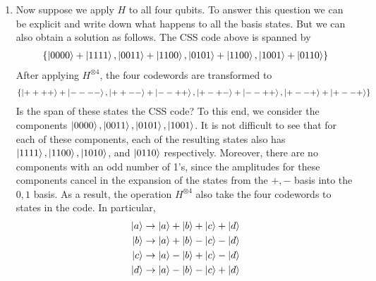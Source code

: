 \documentclass{article}
\theoremstyle{definition}
\begin{document}
\begin{enumerate}[label=(\alph*)]
	\item Now suppose we apply $H$ to all four qubits. To answer this question we can be explicit and write down what happens to all the basis states. But we can also obtain a solution as follows. The CSS code above is spanned by 
	\begin{align*}
		\{ \ket{0000} + \ket{1111}, \ket{0011}+\ket{1100} , \ket{0101} + \ket{1100}, \ket{1001} + \ket{0110}   \}
	\end{align*}
	After applying $H^{\otimes 4}$, the four codewords are transformed to
	\begin{align*}
		\{ \ket{++++} + \ket{----}, \ket{++--}+\ket{--++} , \ket{+-+-} + \ket{--++}, \ket{+--+} + \ket{+--+}   \}
	\end{align*}
	Is the span of these states the CSS code? To this end, we consider the components $\ket{0000}, \ket{0011}, \ket{0101}, \ket{1001}$. It is not difficult to see that for each of these components, each of the resulting states also has $\ket{1111}, \ket{1100}, \ket{1010}$, and $\ket{0110}$ respectively. Moreover, there are no components with an odd number of 1's, since the amplitudes for these components cancel in the expansion of the states from the $+,-$ basis into the $0,1$ basis. As a result, the operation $H^{\otimes 4}$ also take the four codewords to states in the code. In particular, 
	\begin{align*}
		\ket{a} \to \ket{a}+\ket{b}+\ket{c}+\ket{d}\\
		\ket{b} \to \ket{a}+\ket{b}-\ket{c}-\ket{d}\\ 
		\ket{c} \to \ket{a}-\ket{b}+\ket{c}-\ket{d}\\
		\ket{d} \to \ket{a}-\ket{b}-\ket{c}+\ket{d}
	\end{align*} 
\end{enumerate}
\end{document}
